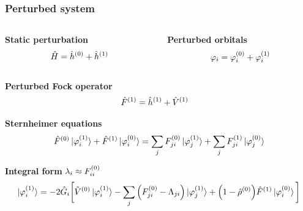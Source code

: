 \begin{frame}
    \frametitle{Perturbed system}
    \begin{columns}
    \begin{column}[b]{0.5\linewidth}
    \centering
    \textbf{Static perturbation}
    \begin{equation}
        \nonumber
        \hat{H} = \hat{h}^{(0)} + \hat{h}^{(1)}
    \end{equation}
    \end{column}

    \begin{column}[b]{0.5\linewidth}
    \centering
    \textbf{Perturbed orbitals}
    \begin{equation}
        \nonumber
        \varphi_i = \varphi_i^{(0)} + \varphi_i^{(1)}
    \end{equation}
    \end{column}
    \end{columns}

    \vspace{5mm}

    \centering
    \textbf{Perturbed Fock operator}
    \begin{align}
        \nonumber
        \hat{F}^{(1)} &= \hat{h}^{(1)} + \hat{V}^{(1)}
    \end{align}

    \vspace{5mm}

    \centering
    \textbf{Sternheimer equations}
    \begin{equation}
        \nonumber
        \hat{F}^{(0)}\ket{\varphi_i^{(1)}} +
        \hat{F}^{(1)}\ket{\varphi_i^{(0)}} =
        \sum_j F_{ji}^{(0)}\ket{\varphi_j^{(1)}} + 
        \sum_j F_{ji}^{(1)}\ket{\varphi_j^{(0)}}
    \end{equation}

    \vspace{5mm}

    \centering
    \textbf{Integral form} $\lambda_{i} \approx F^{(0)}_{ii}$
    \begin{equation}
        \nonumber
        \ket{\varphi_i^{(1)}} = -2\hat{G}_i\bigg[
        \hat{V}^{(0)}\ket{\varphi_i^{(1)}} -
        \sum_j \Big(F^{(0)}_{ji} - \Lambda_{ji}\Big)
        \ket{\varphi_j^{(1)}} +
        \Big(1 - \hat{\rho}^{(0)}\Big)
        \hat{F}^{(1)}\ket{\varphi_i^{(0)}}
        \bigg]
    \end{equation}
\end{frame}

